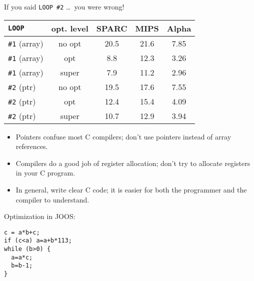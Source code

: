 \begin{slide*}
If you said {\tt LOOP \#2} \ldots\ you were wrong!\\

\begin{center}
\begin{scriptsize}
\begin{tabular}{||l||c|c|c|c||}
\hline
{\tt LOOP} & opt. level & SPARC & MIPS & Alpha \\ \hline \hline
{\tt \#1} (array) & no opt &  20.5  & 21.6  & 7.85 \\ \hline
{\tt \#1} (array) & opt & 8.8  & 12.3  &  3.26\\ \hline
{\tt \#1} (array) & super &  7.9  & 11.2 & 2.96 \\ \hline \hline
{\tt \#2} (ptr)   & no opt & 19.5  & 17.6 & 7.55 \\ \hline
{\tt \#2} (ptr)   & opt & 12.4  & 15.4 & 4.09 \\ \hline
{\tt \#2} (ptr)   & super & 10.7  & 12.9 & 3.94 \\ \hline
\end{tabular}
\end{scriptsize}
\end{center}
\vspace*{2em}

\begin{itemize}
\item Pointers confuse most C compilers; don't use pointers instead of
array references.
\item Compilers do a good job of register allocation; don't try to
allocate registers in your C program.
\item In general, write clear C code; it is easier for both the programmer
and the compiler to understand.
\end{itemize}
\vfil
\end{slide*}
 
\begin{slide*}
Optimization in JOOS:
\begin{verbatim}
c = a*b+c;
if (c<a) a=a+b*113;
while (b>0) {
  a=a*c;
  b=b-1;
} 
\end{verbatim}
\vfil
\end{slide*}

